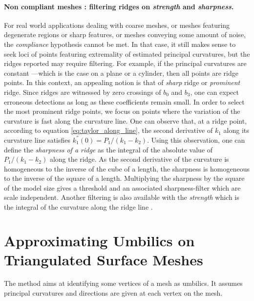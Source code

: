 \paragraph{Non compliant meshes : filtering ridges on {\em
strength} and {\em sharpness}.}
For real world applications dealing with coarse meshes, or meshes
featuring degenerate regions or sharp features, or meshes conveying
some amount of noise, the {\em compliance} hypothesis
\cite{cgal:cp-tdare-05} cannot be met. In that case, it still makes
sense to seek loci of points featuring extremality of estimated
principal curvatures, but the ridges reported may require
filtering. For example, if the principal curvatures are constant
---which is the case on a plane or a cylinder, then all points are
ridge points. In this context, an appealing notion is that of {\em
sharp} ridge or {\em prominent} ridge. Since ridges are witnessed by
zero crossings of $b_0$ and $b_3$, one can expect erroneous detections
as long as these coefficients remain small. In order to select the
most prominent ridge points, we focus on points where the variation of
the curvature is fast along the curvature line.  One can observe that,
at a ridge point, according to  equation
\ref{eq:taylor_along_line}, the second derivative of $k_1$ along its
curvature line satisfies $k_1^{''}(0) = P_1/(k_1-k_2)$.  Using this
observation, one can define the {\em sharpness of a ridge} as the
integral of the absolute value of $P_1/(k_1-k_2)$ along the ridge. As
the second derivative of the curvature is homogeneous to the inverse
of the cube of a length, the sharpness is homogeneous to the inverse
of the square of a length. Multiplying the sharpness by the square of
the model size gives a threshold and an associated sharpness-filter
which are scale independent. Another filtering is also available with
the {\em strength } which is the integral of the curvature along the
ridge line
\cite{cgal:ybs-rvlmi-04}.





\section{Approximating Umbilics on Triangulated Surface Meshes}
\label{umbilic-mesh}

The method aims at identifying some vertices of a mesh as umbilics. It
assumes principal curvatures and directions are given at each vertex
on the mesh.
%

